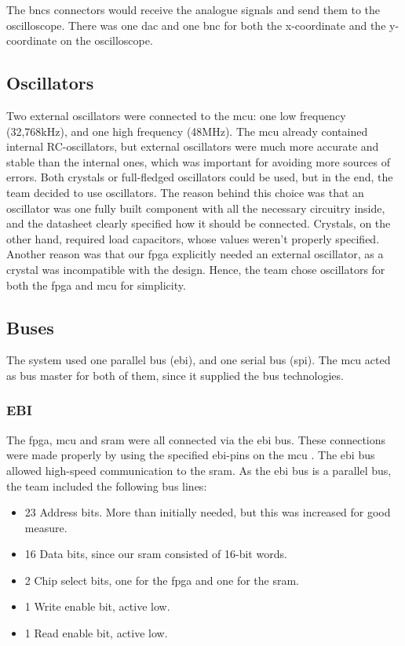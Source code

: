 The \gls{bnc}s connectors would receive the analogue signals and send them to the oscilloscope.
There was one \gls{dac} and one \gls{bnc} for both the x-coordinate and the y-coordinate on the oscilloscope.

\subsection{Oscillators}
Two external oscillators were connected to the \gls{mcu}: one low frequency (32,768kHz), and one high frequency (48MHz).
The \gls{mcu} already contained internal RC-oscillators, but external oscillators were much more accurate and stable than the internal ones, which was important for avoiding more sources of errors.
Both crystals or full-fledged oscillators could be used, but in the end, the team decided to use oscillators.
The reason behind this choice was that an oscillator was one fully built component with all the necessary circuitry inside, and the datasheet clearly specified how it should be connected.
Crystals, on the other hand, required load capacitors, whose values weren't properly specified.
Another reason was that our \gls{fpga} explicitly needed an external oscillator, as a crystal was incompatible with the design.
Hence, the team chose oscillators for both the \gls{fpga} and \gls{mcu} for simplicity.

\subsection{Buses}
The system used one parallel bus (\gls{ebi}), and one serial bus (\gls{spi}).
The \gls{mcu} acted as bus master for both of them, since it supplied the bus technologies.

\subsubsection{EBI}
The \gls{fpga}, \gls{mcu} and \gls{sram} were all connected via the \gls{ebi} bus.
These connections were made properly by using the specified \gls{ebi}-pins on the \gls{mcu} \cite[sec. 4.1]{efm32-datasheet}.
The \gls{ebi} bus allowed high-speed communication to the \gls{sram}.
As the \gls{ebi} bus is a parallel bus, the team included the following bus lines:
\begin{itemize}
\item 23 Address bits. More than initially needed, but this was increased for good measure.
\item 16 Data bits, since our \gls{sram} consisted of 16-bit words.
\item 2 Chip select bits, one for the \gls{fpga} and one for the \gls{sram}.
\item 1 Write enable bit, active low.
\item 1 Read enable bit, active low.
\end{itemize}


